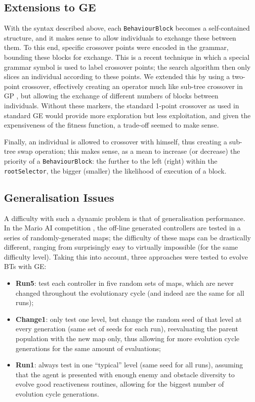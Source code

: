 \documentclass[conference]{IEEEtran}
\begin{document}
\subsection{Extensions to GE}

With the syntax described above, each \texttt{BehaviourBlock} becomes a
self-contained structure, and it makes sense to allow individuals to exchange
these between them. To this end, specific crossover points were encoded in the
grammar, bounding these blocks for exchange. This is a recent technique
\cite{ND06} in which a special grammar symbol
is used to label crossover points; the search algorithm then only
slices an individual according to these points. We extended this by using a
two-point crossover, effectively creating an operator much like sub-tree
crossover in GP \cite{Koz92}, but allowing the exchange of
different numbers of blocks between individuals. Without these markers, the
standard 1-point crossover as used in standard GE would provide more
exploration but less exploitation, and given the expensiveness of the fitness
function, a trade-off seemed to make sense.

Finally, an individual is allowed
to crossover with himself, thus creating a sub-tree swap operation;
this makes sense, as a mean to increase (or decrease) the priority of a
\texttt{BehaviourBlock}: the further to the left (right) within the
\texttt{rootSelector}, the bigger (smaller) the likelihood of execution of a
block.

\subsection{Generalisation Issues}

A difficulty with such a dynamic problem is that of generalisation performance.
In the Mario AI competition \cite{TKK09}, the off-line generated controllers
are tested in a series of randomly-generated maps; the difficulty of these maps
can be drastically different, ranging from surprisingly easy to virtually
impossible (for the same difficulty level). Taking this into account, three
approaches were tested to evolve BTs with GE:
\begin{itemize}
	\item \textbf{Run5}: test each controller in five
	random sets of maps, which are never changed throughout the
	evolutionary cycle (and indeed are the same for all runs);
	\item \textbf{Change1}: only test one level, but change the random seed
	of that level at every generation (same set of seeds for each run),
	reevaluating the parent population with the new map only, thus
	allowing for more evolution cycle generations for the same amount
	of evaluations;
	\item \textbf{Run1}: always test in one ``typical'' level (same seed
	for all runs), assuming that the agent is presented with enough enemy
	and obstacle diversity to evolve good reactiveness routines, allowing
	for the biggest number of evolution cycle generations.
\end{itemize}
\end{document}
